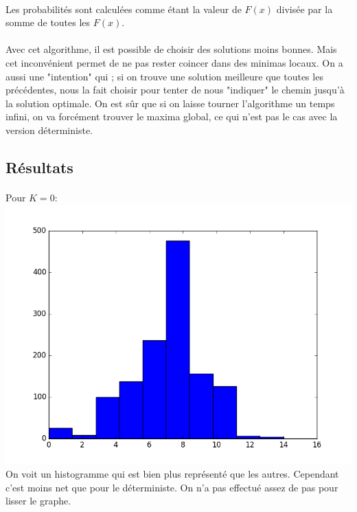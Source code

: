 \documentclass[a4paper, 11pt]{article}
\begin{document}
\paragraph{}
Les probabilités sont calculées comme étant la valeur de $F(x)$ divisée par la somme de toutes les $F(x)$.

\paragraph{}
Avec cet algorithme, il est possible de choisir des solutions moins bonnes. Mais cet inconvénient permet de ne pas rester coincer dans des 
minimas locaux.
On a aussi une "intention" qui ; si on trouve une solution meilleure que toutes les précédentes, nous la fait choisir pour tenter de
nous "indiquer" le chemin jusqu'à la solution optimale.
On est sûr que si on laisse tourner l'algorithme un temps infini, on va forcément trouver le maxima global, ce qui n'est pas le cas avec
la version déterministe.

\subsection{Résultats}

\paragraph{}
Pour $K=0$:\\
\includegraphics[scale=0.5]{d_p_0}
\\
On voit un histogramme qui est bien plus représenté que les autres. Cependant c'est moins net que pour le déterministe. On n'a pas 
effectué assez de pas pour lisser le graphe.
\end{document}
